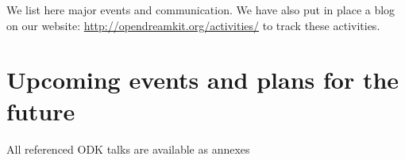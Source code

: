 \documentclass{deliverablereport}
\begin{document}
We list here major events and communication. We have also put in place
a blog on our website: \url{http://opendreamkit.org/activities/} to track
these activities.
























\section{Upcoming events and plans for the future}


\newpage\printbibliography

{\footnotesize All referenced ODK talks are available as annexes}
\end{document}
